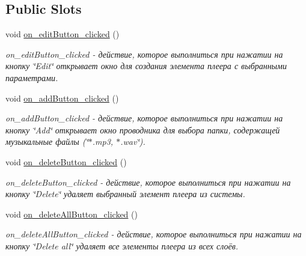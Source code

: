 \subsection*{Public Slots}
\begin{DoxyCompactItemize}
\item 
\mbox{\label{class_key_main_window_a683dc7c13297f6f0bd3401ebfbf46e42}} 
void \hyperlink{class_key_main_window_a683dc7c13297f6f0bd3401ebfbf46e42}{on\+\_\+edit\+Button\+\_\+clicked} ()
\begin{DoxyCompactList}\small\item\em on\+\_\+edit\+Button\+\_\+clicked -\/ действие, которое выполниться при нажатии на кнопку \char`\"{}\+Edit\char`\"{} открывает окно для создания элемента плеера с выбранными параметрами. \end{DoxyCompactList}\item 
\mbox{\label{class_key_main_window_a3e22453536f1a459df12248b5590c31b}} 
void \hyperlink{class_key_main_window_a3e22453536f1a459df12248b5590c31b}{on\+\_\+add\+Button\+\_\+clicked} ()
\begin{DoxyCompactList}\small\item\em on\+\_\+add\+Button\+\_\+clicked -\/ действие, которое выполниться при нажатии на кнопку \char`\"{}\+Add\char`\"{} открывает окно проводника для выбора папки, содержащей музыкальные файлы (\char`\"{}$\ast$.\+mp3, $\ast$.\+wav\char`\"{}). \end{DoxyCompactList}\item 
\mbox{\label{class_key_main_window_a5f4dc1cdd9398259fba83c17cf61ae53}} 
void \hyperlink{class_key_main_window_a5f4dc1cdd9398259fba83c17cf61ae53}{on\+\_\+delete\+Button\+\_\+clicked} ()
\begin{DoxyCompactList}\small\item\em on\+\_\+delete\+Button\+\_\+clicked -\/ действие, которое выполниться при нажатии на кнопку \char`\"{}\+Delete\char`\"{} удаляет выбранный элемент плеера из системы. \end{DoxyCompactList}\item 
\mbox{\label{class_key_main_window_a2d07b299cbc4bf9550defad3ccbf0029}} 
void \hyperlink{class_key_main_window_a2d07b299cbc4bf9550defad3ccbf0029}{on\+\_\+delete\+All\+Button\+\_\+clicked} ()
\begin{DoxyCompactList}\small\item\em on\+\_\+delete\+All\+Button\+\_\+clicked -\/ действие, которое выполниться при нажатии на кнопку \char`\"{}\+Delete all\char`\"{} удаляет все элементы плеера из всех слоёв. \end{DoxyCompactList}\item 

\end{DoxyCompactItemize}
